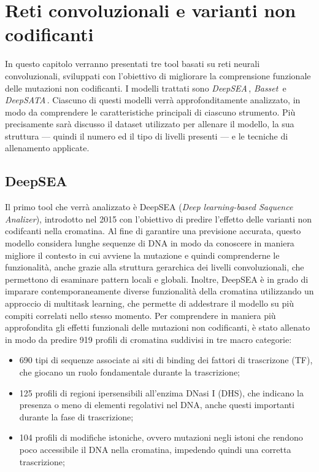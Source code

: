 \chapter{Reti convoluzionali e varianti non codificanti}\label{chp:CNN-non-coding-variants}

In questo capitolo verranno presentati tre tool basati su reti neurali convoluzionali, sviluppati con l'obiettivo di migliorare la comprensione funzionale delle mutazioni non codificanti. I modelli trattati sono \textsl{DeepSEA}\,\cite{zhou2015predicting}, \textsl{Basset}\,\cite{kelley2016basset} e \textsl{DeepSATA}\,\cite{ma2023deepsata}. Ciascuno di questi modelli verrà approfonditamente analizzato, in modo da comprendere le caratteristiche principali di ciascuno strumento. Più precisamente sarà discusso il dataset utilizzato per allenare il modello, la sua struttura — quindi il numero ed il tipo di livelli presenti — e le tecniche di allenamento applicate.





\section{DeepSEA}\label{sec:DeepSEA}
% 
Il primo tool che verrà analizzato è DeepSEA (\textit{Deep learning-based Saquence Analizer}), introdotto nel 2015 con l'obiettivo di predire l'effetto delle varianti non codifcanti nella cromatina. Al fine di garantire una previsione accurata, questo modello considera lunghe sequenze di \acs{DNA} in modo da conoscere in maniera migliore il contesto in cui avviene la mutazione e quindi comprenderne le funzionalità, anche grazie alla struttura gerarchica dei livelli convoluzionali, che permettono di esaminare pattern locali e globali. 
Inoltre, DeepSEA è in grado di imparare contemporaneamente diverse funzionalità della cromatina utilizzando un approccio di multitask learning, che permette di addestrare il modello su più compiti correlati nello stesso momento. Per comprendere in maniera più approfondita gli effetti funzionali delle mutazioni non codificanti, è stato allenato in modo da predire 919 profili di cromatina suddivisi in tre macro categorie:
% 
\begin{itemize}
    \item 690 tipi di sequenze associate ai siti di binding dei fattori di trascrizone (\acs{TF}), che giocano un ruolo fondamentale durante la trascrizione;
    \item 125 profili di regioni ipersensibili all'enzima DNasi I (\acs{DHS}), che indicano la presenza o meno di elementi regolativi nel \acs{DNA}, anche questi importanti durante la fase di trascrizione;
    \item 104 profili di modifiche istoniche, ovvero mutazioni negli istoni che rendono poco accessibile il \acs{DNA} nella cromatina, impedendo quindi una corretta trascrizione;
\end{itemize}
% 

